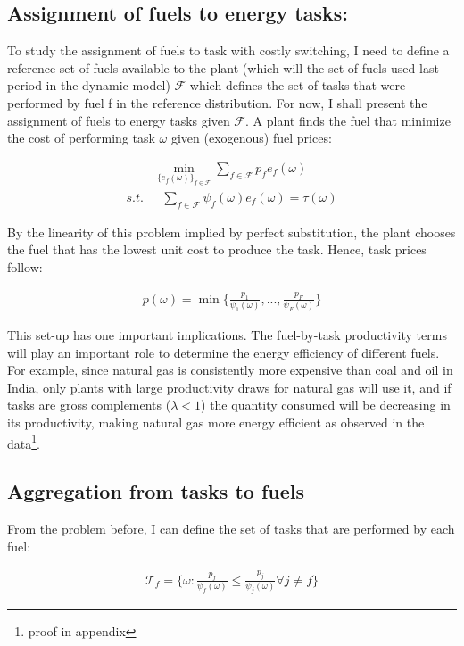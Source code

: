 \documentclass{article}
\begin{document}
\subsection{Assignment of fuels to energy tasks: } 

To study the assignment of fuels to task with costly switching, I need to define a reference set of fuels available to the plant (which will the set of fuels used last period in the dynamic model) $\mathcal{F}$ which defines the set of tasks that were performed by fuel f in the reference distribution. For now, I shall present the assignment of fuels to energy tasks given $\mathcal{F}$. A plant finds the fuel that minimize the cost of performing task $\omega$ given (exogenous) fuel prices:

\begin{align*}
    &\min_{\{e_f(\omega)\}_{f \in \mathcal{F}}} \sum_{f \in \mathcal{F}} p_f e_f(\omega) \\
    s.t. &\text{   } \sum_{f \in \mathcal{F} } \psi_f(\omega) e_f(\omega) = \tau(\omega)
\end{align*}

By the linearity of this problem implied by perfect substitution, the plant chooses the fuel that has the lowest unit cost to produce the task. Hence, task prices follow:

\begin{align}
    p(\omega) = \min \Big\{ \frac{p_1}{ \psi_1(\omega)},...,\frac{p_F}{\psi_F(\omega)} \Big\}
\end{align}

This set-up has one important implications. The fuel-by-task productivity terms will play an important role to determine the energy efficiency of different fuels. For example, since natural gas is consistently more expensive than coal and oil in India, only plants with large productivity draws for natural gas will use it, and if tasks are gross complements ($\lambda < 1$) the quantity consumed will be decreasing in its productivity, making natural gas more energy efficient as observed in the data\footnote{proof in appendix}.

\subsection{Aggregation from tasks to fuels}

From the problem before, I can define the set of tasks that are performed by each fuel:

\begin{align}
    \mathcal{T}_f = \Big\{ \omega: \frac{p_f}{\psi_f(\omega)} \leq \frac{p_j}{\psi_j(\omega)} \forall j \neq f  \Big\}
\end{align}
\end{document}

